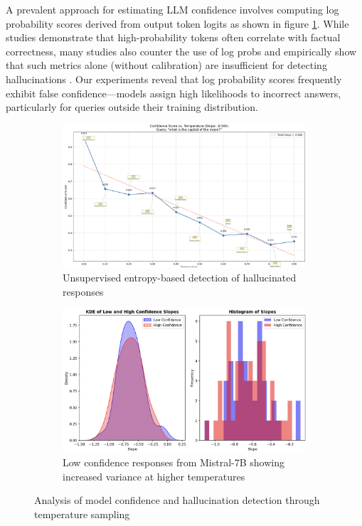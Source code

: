\documentclass[sigconf]{acmart}
\begin{document}
A prevalent approach for estimating LLM confidence involves computing log probability scores derived from output token logits \cite{emnlp_2015} as shown in figure \ref{fig:entropy}. While studies \cite{strength_in_numbers} demonstrate that high-probability tokens often correlate with factual correctness, many studies also counter the use of log probs and empirically show that such metrics alone (without calibration) are insufficient for detecting hallucinations \cite{cycles_thought,calibrated_hallucinate}. Our experiments reveal that log probability scores frequently exhibit false confidence—models assign high likelihoods to incorrect answers, particularly for queries outside their training distribution.

\begin{figure}[ht]
\centering
\begin{subfigure}{0.48\textwidth}
    \includegraphics[width=\textwidth]{images/unsupervised_entropy.png}
    \caption{Unsupervised entropy-based detection of hallucinated responses}
    \label{fig:entropy}
\end{subfigure}
\hfill
\begin{subfigure}{0.48\textwidth}
    \includegraphics[width=\textwidth]{images/low_conf_mistral.png}
    \caption{Low confidence responses from Mistral-7B showing increased variance at higher temperatures}
    \label{fig:low_conf}
\end{subfigure}
\caption{Analysis of model confidence and hallucination detection through temperature sampling}
\label{fig:confidence_analysis}
\end{figure}
\end{document}
